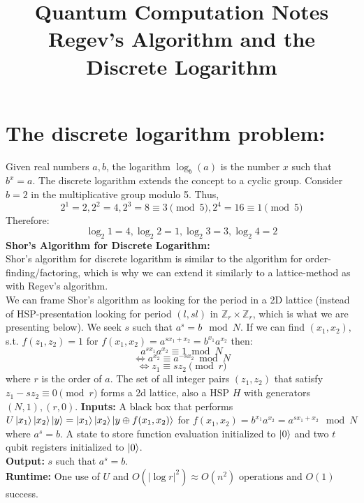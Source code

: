 \documentclass{article}
\title{Quantum Computation Notes \\ \large Regev's Algorithm and the Discrete Logarithm}
\author{}
\date{}
\begin{document}
\maketitle
\section{The discrete logarithm problem:}
Given real numbers $a,b$, the logarithm $\log_b(a)$ is the number $x$ such that $b^x = a$. The discrete logarithm extends the concept to a cyclic group. Consider $b=2$ in the multiplicative group modulo 5.
Thus,
$$2^1 = 2, 2^2 = 4, 2^3 = 8  \equiv 3 \pmod 5, 2^4 = 16 \equiv 1 \pmod 5$$
Therefore:
$$\log_2 1 = 4, \log_2 2 = 1, \log_2 3 = 3, \log_2 4 = 2$$
\textbf{Shor's Algorithm for Discrete Logarithm:}\\
Shor's algorithm for discrete logarithm is similar to the algorithm for order-finding/factoring, which is why we can extend it similarly to a lattice-method as with Regev's algorithm.\\
We can frame Shor's algorithm as looking for the period in a 2D lattice (instead of HSP-presentation looking for period $(l, sl)$ in $\mathbb{Z}_r \times \mathbb{Z}_r$, which is what we are presenting below). We seek $s$ such that $a^s = b \mod N$. If we can find $(x_1, x_2),$ s.t. $f(z_1, z_2) = 1$ for $f(x_1, x_2) = a^{sx_1 + x_2} = b^{x_1}  a^{x_2}$ then:
$$a^{sx_1} a^{x_2} \equiv 1 \bmod N$$
$$\iff a^{x_2} \equiv a^{-sx_2} \bmod N$$
$$\iff z_1 \equiv sz_2 \pmod r$$
where $r$ is the order of $a$.  The set of all integer pairs $(z_1, z_2)$ that satisfy $z_1 - sz_2 \equiv 0 \pmod r$ forms a 2d lattice, also a HSP $H$ with generators $(N, 1), (r, 0)$.
\textbf{Inputs:} A black box that performs $U\ket{x_1}\ket{x_2}\ket{y} = \ket{x_1}\ket{x_2}\ket{y\oplus f(x_1,x_2)}$ for $f(x_1,x_2) = b^{x_1}a^{x_2} = a^{sx_1 + x_2} \mod N$ where $a^s = b$. A state to store function evaluation initialized to $\ket0$ and two $t$ qubit registers initialized to $\ket0$.\\
\textbf{Output:} $s$ such that $a^s = b$.\\
\textbf{Runtime:} One use of $U$ and $O(|\log r|^2) \approx O(n^2)$ operations and $O(1)$ success.
\end{document}
